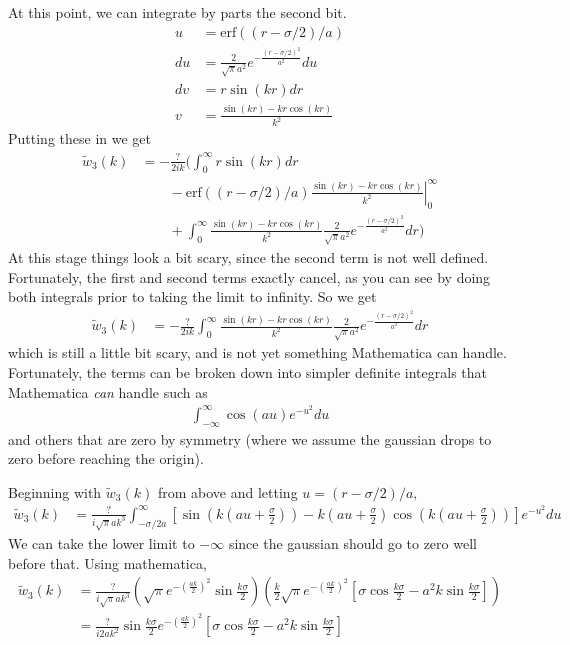\documentclass[letterpaper,twocolumn,amsmath,amssymb,prb]{revtex4-1}
\begin{document}
At this point, we can integrate by parts the second bit.
\begin{align}
  u &= \mathrm{erf}((r-\sigma/2)/a) \\
  du &= \frac{2}{\sqrt{\pi}a^2} e^{-\frac{(r-\sigma/2)^2}{a^2}} du \\
  dv &= r \sin(kr) dr \\
  v &= \frac{\sin(kr) - kr \cos(kr)}{k^2}
\end{align}
Putting these in we get
\begin{align}
  \tilde{w}_3(k)
  &=  -\frac{?}{2ik} \Big(
  \int_0^\infty r \sin(kr) dr\\ &\quad\quad
  -
  \left.\mathrm{erf}((r-\sigma/2)/a)\frac{\sin(kr) - kr
    \cos(kr)}{k^2}\right|_0^\infty\\ &\quad\quad
  +
  \int_0^\infty \frac{\sin(kr) - kr \cos(kr)}{k^2}\frac{2}{\sqrt{\pi}a^2} e^{-\frac{(r-\sigma/2)^2}{a^2}} dr
  \Big)
\end{align}
At this stage things look a bit scary, since the second term is not
well defined.  Fortunately, the first and second terms exactly cancel,
as you can see by doing both integrals prior to taking the limit to
infinity.  So we get
\begin{align}
  \tilde{w}_3(k)
  &=  -\frac{?}{2ik}\int_0^\infty \frac{\sin(kr) - kr
    \cos(kr)}{k^2}\frac{2}{\sqrt{\pi}a^2}
  e^{-\frac{(r-\sigma/2)^2}{a^2}} dr
\end{align}
which is still a little bit scary, and is not yet something
Mathematica can handle.  Fortunately, the terms can be broken down
into simpler definite integrals that Mathematica \emph{can} handle
such as
\begin{align}
  \int_{-\infty}^\infty \cos(a u)e^{-u^2}du
\end{align}
and others that are zero by symmetry (where we assume the gaussian
drops to zero before reaching the origin).
\begin{widetext}
Beginning with $\tilde{w}_3(k)$ from above and letting $u = (r-\sigma/2)/a,$
  \begin{align}
    \tilde{w}_3(k)
    &=  \frac{?}{i\sqrt{\pi}ak^3}\int_{-\sigma/2a}^\infty \left[ \sin(k(au+\frac{\sigma}{2})) 
      - k(au + \frac{\sigma}{2}) \cos(k(au+\frac{\sigma}{2}))\right] e^{-u^2} du
  \end{align}
We can take the lower limit to $-\infty$ since the gaussian should go
to zero well before that. Using mathematica,
  \begin{align}
    \tilde{w}_3(k) 
      &= \frac{?}{i\sqrt{\pi}ak^3}
    \left(\sqrt{\pi}e^{-\left(\frac{ak}{2}\right)^2}
      \sin{\frac{k\sigma}{2}} \right) \left( \frac{k}{2}
      \sqrt{\pi}e^{-\left(\frac{ak}{2}\right)^2} \left[\sigma
          \cos{\frac{k \sigma}{2}} - a^2 k \sin{\frac{k \sigma}{2}}
          \right] \right) \\
      &= \frac{?}{i2ak^2}\sin{\frac{k
          \sigma}{2}}e^{-\left(\frac{ak}{2}\right)^2} \left[\sigma
          \cos{\frac{k \sigma}{2}} - a^2 k \sin{\frac{k \sigma}{2}}\right]
  \end{align}
\end{widetext}
\end{document}

